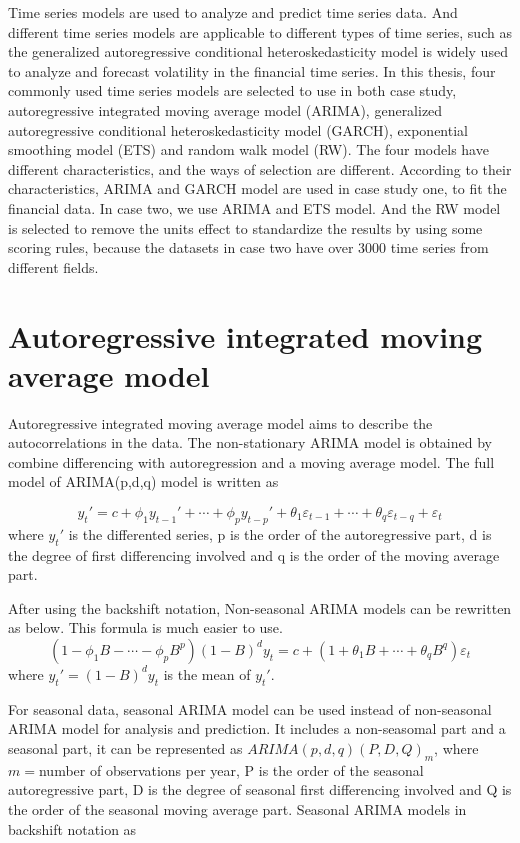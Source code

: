 \documentclass{monashthesis}
\theoremstyle{definition}
\theoremstyle{definition}
\theoremstyle{definition}
\theoremstyle{remark}
\begin{document}
Time series models are used to analyze and predict time series data. And
different time series models are applicable to different types of time
series, such as the generalized autoregressive conditional
heteroskedasticity model is widely used to analyze and forecast
volatility in the financial time series. In this thesis, four commonly
used time series models are selected to use in both case study,
autoregressive integrated moving average model (ARIMA), generalized
autoregressive conditional heteroskedasticity model (GARCH), exponential
smoothing model (ETS) and random walk model (RW). The four models have
different characteristics, and the ways of selection are different.
According to their characteristics, ARIMA and GARCH model are used in
case study one, to fit the financial data. In case two, we use ARIMA and
ETS model. And the RW model is selected to remove the units effect to
standardize the results by using some scoring rules, because the
datasets in case two have over 3000 time series from different fields.

\section{Autoregressive integrated moving average
model}\label{autoregressive-integrated-moving-average-model}

Autoregressive integrated moving average model aims to describe the
autocorrelations in the data. The non-stationary ARIMA model is obtained
by combine differencing with autoregression and a moving average model.
The full model of ARIMA(p,d,q) model is written as

\[y_t'=c+\phi_1y_{t-1}'+\cdots+\phi_py_{t-p}'+\theta_1\varepsilon_{t-1}+\cdots+\theta_q\varepsilon_{t-q}+\varepsilon_t\]
where \(y_t'\) is the differented series, p is the order of the
autoregressive part, d is the degree of first differencing involved and
q is the order of the moving average part.

After using the backshift notation, Non-seasonal ARIMA models can be
rewritten as below. This formula is much easier to use.
\[(1-\phi_1B-\cdots-\phi_pB^p)(1-B)^dy_t=c+(1+\theta_1B+\cdots+\theta_qB^q)\varepsilon_t\]
where \(y_t'=(1-B)^dy_t\) is the mean of \(y_t'\).

For seasonal data, seasonal ARIMA model can be used instead of
non-seasonal ARIMA model for analysis and prediction. It includes a
non-seasomal part and a seasonal part, it can be represented as
\(ARIMA(p,d,q)(P,D,Q)_m\), where \(m=\)number of observations per year,
P is the order of the seasonal autoregressive part, D is the degree of
seasonal first differencing involved and Q is the order of the seasonal
moving average part. Seasonal ARIMA models in backshift notation as
\end{document}
